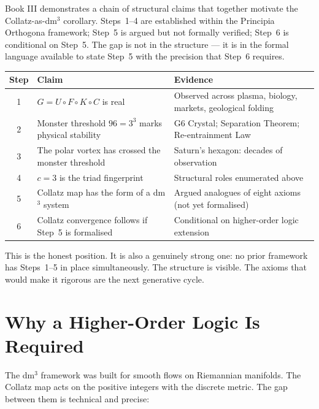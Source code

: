 \documentclass[11pt]{article}
\begin{document}
Book III demonstrates a chain of structural claims that together motivate the Collatz-as-dm$^3$
corollary. Steps~1--4 are established within the Principia Orthogona framework; Step~5 is argued
but not formally verified; Step~6 is conditional on Step~5. The gap is not in the structure --- it
is in the formal language available to state Step~5 with the precision that Step~6 requires.

\medskip
\begin{center}
\begin{tabular}{clp{7.5cm}}
\hline
\textbf{Step} & \textbf{Claim} & \textbf{Evidence} \\
\hline
1 & $G = U \circ F \circ K \circ C$ is real & Observed across plasma, biology, markets,
  geological folding \\
2 & Monster threshold $96 = 3^3$ marks physical stability & G6 Crystal; Separation Theorem;
  Re-entrainment Law \\
3 & The polar vortex has crossed the monster threshold & Saturn's hexagon: decades of observation \\
4 & $c = 3$ is the triad fingerprint & Structural roles enumerated above \\
5 & Collatz map has the form of a dm$^3$ system & Argued analogues of eight axioms (not yet
  formalised) \\
6 & Collatz convergence follows if Step~5 is formalised & Conditional on higher-order logic
  extension \\
\hline
\end{tabular}
\end{center}
\medskip

This is the honest position. It is also a genuinely strong one: no prior framework has Steps~1--5
in place simultaneously. The structure is visible. The axioms that would make it rigorous are the
next generative cycle.

\section{Why a Higher-Order Logic Is Required}

The dm$^3$ framework was built for smooth flows on Riemannian manifolds. The Collatz map acts on
the positive integers with the discrete metric. The gap between them is technical and precise:
\end{document}
